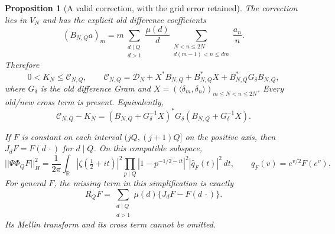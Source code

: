 \documentclass[11pt]{article}
\def\norm#1{||#1||}%
\newtheorem{proposition}[theorem]{Proposition}
\theoremstyle{remark}
\newcommand{\norm}[1]{\left\lVert #1\right\rVert}
\begin{document}
\begin{proposition}[A valid correction, with the grid error retained]
\label{prop:ns60-grid-correction}
The correction lies in $V_N$ and has the explicit old difference
coefficients
\begin{equation}
 (B_{N,Q}a)_m
 =m\sum_{\substack{d\mid Q\\d>1}}\frac{\mu(d)}d
       \sum_{\substack{N<n\leq2N\\d(m-1)<n\leq dm}}\frac{a_n}{n}.
 \label{eq:ns60-correction-matrix}
\end{equation}
Therefore
\begin{equation}
 0<K_N\leq\mathcal C_{N,Q},\qquad
 \mathcal C_{N,Q}
 =\mathcal D_N+X^*B_{N,Q}+B_{N,Q}^*X+B_{N,Q}^*G_\delta B_{N,Q},
 \label{eq:ns60-full-correction-gram}
\end{equation}
where $G_\delta$ is the old difference Gram and
$X=(\langle\delta_m,\delta_n\rangle)_{m\leq N<n\leq2N}$.
Every old/new cross term is present.
Equivalently,
\[
 \mathcal C_{N,Q}-K_N
 =(B_{N,Q}+G_\delta^{-1}X)^*G_\delta
                         (B_{N,Q}+G_\delta^{-1}X).
\]

If $F$ is constant on each interval $(jQ,(j+1)Q]$ on the positive
axis, then $J_dF=F(d\,\cdot)$ for $d\mid Q$. On this compatible
subspace,
\begin{equation}
 \norm{\Psi\Phi_QF}_H^2
 =\frac1{2\pi}\int_{\mathbb R}|\zeta(\tfrac12+it)|^2
       \prod_{p\mid Q}|1-p^{-1/2-it}|^2
       |\widehat q_F(t)|^2\,dt,
 \qquad q_F(v)=e^{v/2}F(e^v).
 \label{eq:ns60-compatible-euler}
\end{equation}
For general $F$, the missing term in this simplification is exactly
\begin{equation}
 R_QF=\sum_{\substack{d\mid Q\\d>1}}\mu(d)
                   \{J_dF-F(d\,\cdot)\}.
 \label{eq:ns60-grid-defect}
\end{equation}
Its Mellin transform and its cross term cannot be omitted.
\end{proposition}
\end{document}
